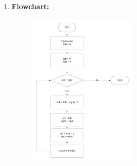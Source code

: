 \documentclass[11pt,a4paper]{article}
\begin{document}
{\begin{enumerate}[label=\textbf{\arabic*})]
\begin{algorithm}
\begin{algorithmic}[1]
            			\State return c
            		\EndProcedure
            	\end{algorithmic}
            \end{algorithm}
				\item \textbf{Flowchart:}
					\begin{figure}[H]
						\centering 
						\includegraphics[width=0.5\textwidth]{Merge Sort}
					\end{figure}
					

\end{enumerate}}
\end{document}
